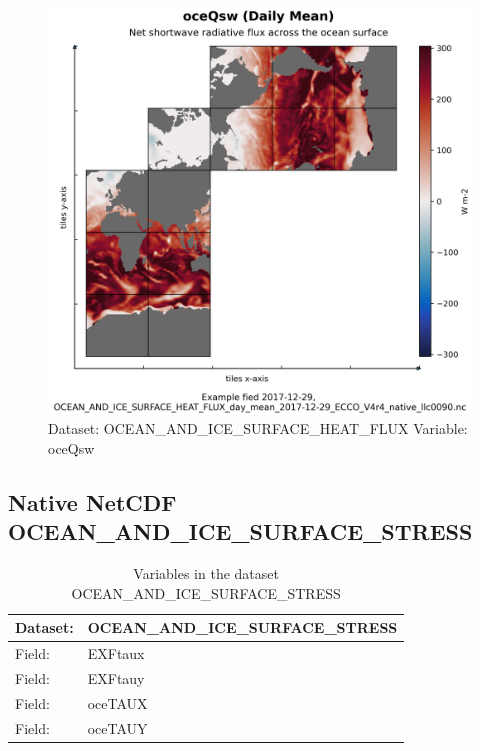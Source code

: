 \begin{figure}[H]
\centering
\includegraphics[scale=0.55]{../images/plots/native_plots/Ocean_and_Sea-Ice_Surface_Heat_Fluxes/oceQsw.png}
\caption{Dataset: OCEAN\_AND\_ICE\_SURFACE\_HEAT\_FLUX Variable: oceQsw}
\label{tab:table-OCEAN_AND_ICE_SURFACE_HEAT_FLUX_oceQsw-Plot}
\end{figure}
\pagebreak
\subsection{Native NetCDF OCEAN\_AND\_ICE\_SURFACE\_STRESS}
\newp
\begin{longtable}{|p{}|p{}|}
\caption{Variables in the dataset OCEAN\_AND\_ICE\_SURFACE\_STRESS}
\label{tab:table-OCEAN_AND_ICE_SURFACE_STRESS-fields} \\ 
\hline \endhead \hline \endfoot
\rowcolor{lightgray} \textbf{Dataset:} & \textbf{OCEAN\_AND\_ICE\_SURFACE\_STRESS} \\ \hline
Field: &EXFtaux \\ \hline
Field: &EXFtauy \\ \hline
Field: &oceTAUX \\ \hline
Field: &oceTAUY \\ \hline
\end{longtable}

\pagebreak
